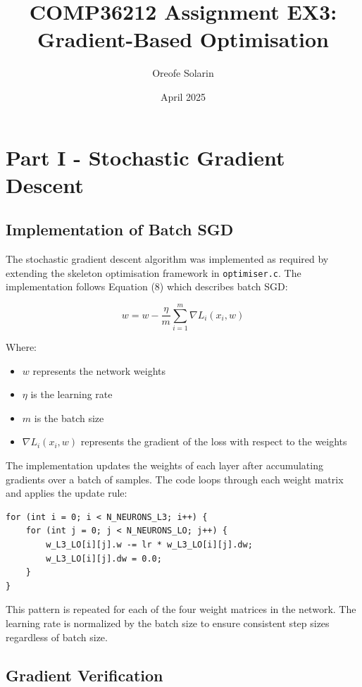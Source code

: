 \documentclass{article}
\title{COMP36212 Assignment EX3: Gradient-Based Optimisation}
\author{Oreofe Solarin} %
\date{April 2025} %
\begin{document}
\maketitle

\section{Part I - Stochastic Gradient Descent}

\subsection{Implementation of Batch SGD}

The stochastic gradient descent algorithm was implemented as required 
by extending the skeleton optimisation framework in 
\texttt{optimiser.c}. The implementation follows Equation (8)
which describes batch SGD:

\begin{equation}
w = w - \frac{\eta}{m} \sum_{i=1}^{m}\nabla L_{i}(x_{i},w)
\end{equation}

\noindent Where:
\noindent \begin{itemize}
  \item $w$ represents the network weights
  \item $\eta$ is the learning rate
  \item $m$ is the batch size
  \item $\nabla L_{i}(x_{i},w)$ represents the gradient of the loss with respect to the weights
\end{itemize}

\noindent The implementation updates the weights of each layer 
after accumulating gradients over a batch of samples. 
The code loops through each weight matrix and applies the 
update rule:

\begin{verbatim}
for (int i = 0; i < N_NEURONS_L3; i++) {
    for (int j = 0; j < N_NEURONS_LO; j++) {
        w_L3_LO[i][j].w -= lr * w_L3_LO[i][j].dw;
        w_L3_LO[i][j].dw = 0.0;
    }
}
\end{verbatim}

\noindent This pattern is repeated for each of the four weight 
matrices in the network. The learning rate is normalized by 
the batch size to ensure consistent step sizes regardless 
of batch size.

\subsection{Gradient Verification}
\end{document}
